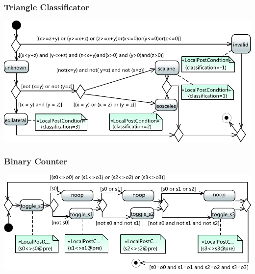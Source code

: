 \documentclass{beamer}
\begin{document}
\begin{frame}
\frametitle{Triangle Classificator}
% 
\includegraphics[width=\textwidth]{./pics/TriangleClasivicator.pdf}
\end{frame}
\begin{frame}
\frametitle{Binary Counter}
% 
\includegraphics[width=\textwidth]{./pics/BinaryCounderSMT.pdf}
\end{frame}
\end{document}
